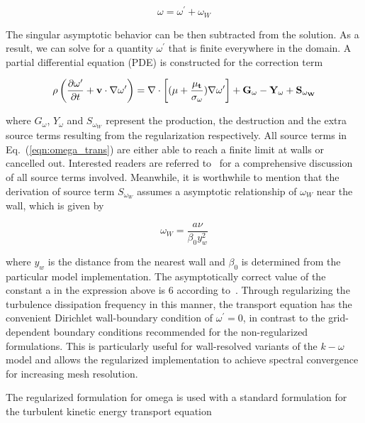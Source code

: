 \begin{equation}
    \omega = \omega^\prime + \omega_W 
\end{equation}

The singular asymptotic behavior can be then subtracted from the solution.
As a result, we can solve for a quantity $\omega^\prime$ that is finite everywhere in the domain.
A partial differential equation (PDE) is constructed for the correction term

\begin{equation}
\label{eqn:omega_trans}
\rho \left( \frac{\partial \omega^\prime}{\partial t} + \bf{v} \cdot \bf{\nabla}  \omega^\prime \right) =  \bf{\nabla} \cdot \left[ (\mu+\frac{\mu_t}{\sigma_\omega } ) \bf{\nabla} \omega^\prime \right] + G_{\omega} - Y_{\omega} + S_{\omega_W}
\end{equation}

where $G_{\omega}$, $Y_{\omega}$ and $S_{\omega_W}$ represent the production, the destruction and the extra source terms resulting from the regularization respectively.
All source terms in Eq.~(\ref{eqn:omega_trans}) are either able to reach a finite limit at walls or cancelled out.
Interested readers are referred to~\cite{Tomboulides2018} for a comprehensive discussion of all source terms involved.
Meanwhile, it is worthwhile to mention that the derivation of source term $S_{\omega_W}$ assumes a asymptotic relationship of $\omega_W$ near the wall, which is given by 

\begin{equation}
    \omega_W = \frac{a \nu}{\beta_0 y_w^2} 
\end{equation}

where $y_w$ is the distance from the nearest wall and $\beta_0$ is determined from the particular model implementation.
The asymptotically correct value of the constant a in the expression above is 6 according to~\cite{Wilcox1998}.
Through regularizing the turbulence dissipation frequency in this manner, the transport equation has the convenient Dirichlet wall-boundary condition of $\omega^\prime = 0$, in contrast to the grid-dependent boundary conditions recommended for the non-regularized formulations.
This is particularly useful for wall-resolved variants of the $k-\omega$ model and allows the regularized implementation to achieve spectral convergence for increasing mesh resolution.

The regularized formulation for omega is used with a standard formulation for the turbulent kinetic energy transport equation~\citep{Wilcox1988}

